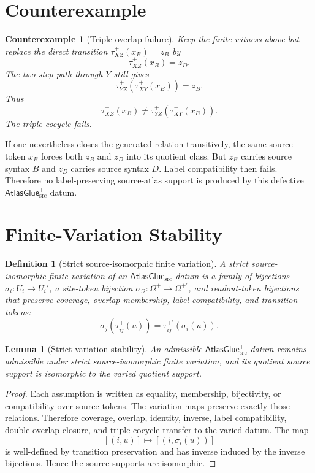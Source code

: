 \documentclass[11pt]{article}
\newcommand{\AtlasGlue}{\mathsf{AtlasGlue}_{\mathrm{src}}^{+}}
\newtheorem{definition}{Definition}
\newtheorem{lemma}{Lemma}
\newtheorem{counterexample}{Counterexample}
\begin{document}
\section{Counterexample}

\begin{counterexample}[Triple-overlap failure]
Keep the finite witness above but replace the direct transition
\(\tau_{XZ}^+(x_B)=z_B\) by
\[
  \tau_{XZ}^+(x_B)=z_D .
\]
The two-step path through \(Y\) still gives
\[
  \tau_{YZ}^+(\tau_{XY}^+(x_B))=z_B.
\]
Thus
\[
  \tau_{XZ}^+(x_B)\ne
  \tau_{YZ}^+(\tau_{XY}^+(x_B)).
\]
The triple cocycle fails.
\end{counterexample}

If one nevertheless closes the generated relation transitively, the same
source token \(x_B\) forces both \(z_B\) and \(z_D\) into its quotient class.
But \(z_B\) carries source syntax \(B\) and \(z_D\) carries source syntax
\(D\). Label compatibility then fails. Therefore no label-preserving
source-atlas support is produced by this defective \(\AtlasGlue\) datum.

\section{Finite-Variation Stability}

\begin{definition}[Strict source-isomorphic finite variation]
A strict source-isomorphic finite variation of an \(\AtlasGlue\) datum is a
family of bijections \(\sigma_i:U_i\to U_i'\), a site-token bijection
\(\sigma_\Omega:\Omega^+\to\Omega^{+\prime}\), and readout-token bijections
that preserve coverage, overlap membership, label compatibility, and
transition tokens:
\[
  \sigma_j(\tau_{ij}^+(u))=\tau_{ij}^{+\prime}(\sigma_i(u)).
\]
\end{definition}

\begin{lemma}[Strict variation stability]
An admissible \(\AtlasGlue\) datum remains admissible under strict
source-isomorphic finite variation, and its quotient source support is
isomorphic to the varied quotient support.
\end{lemma}

\begin{proof}
Each assumption is written as equality, membership, bijectivity, or
compatibility over source tokens. The variation maps preserve exactly those
relations. Therefore coverage, overlap, identity, inverse, label
compatibility, double-overlap closure, and triple cocycle transfer to the
varied datum. The map
\[
  [(i,u)]\mapsto[(i,\sigma_i(u))]
\]
is well-defined by transition preservation and has inverse induced by the
inverse bijections. Hence the source supports are isomorphic.
\end{proof}
\end{document}
